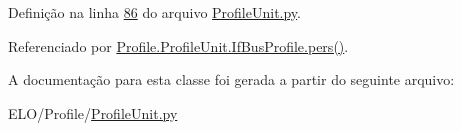 Definição na linha \hyperlink{ProfileUnit_8py_source_l00086}{86} do arquivo \hyperlink{ProfileUnit_8py_source}{Profile\-Unit.\-py}.



Referenciado por \hyperlink{classProfile_1_1ProfileUnit_1_1IfBusProfile_a996592f4b01e0540f45d042065d5a7f4}{Profile.\-Profile\-Unit.\-If\-Bus\-Profile.\-pers()}.



A documentação para esta classe foi gerada a partir do seguinte arquivo\-:\begin{DoxyCompactItemize}
\item 
E\-L\-O/\-Profile/\hyperlink{ProfileUnit_8py}{Profile\-Unit.\-py}\end{DoxyCompactItemize}
